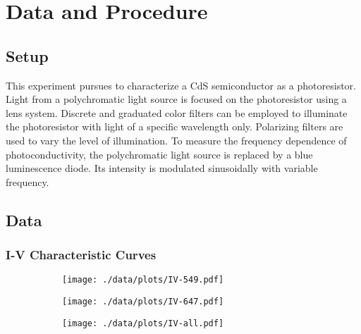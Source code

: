 \chapter{Data and Procedure}

\section{Setup}
This experiment pursues to characterize a CdS semiconductor as a photoresistor.
Light from a polychromatic light source is focused on the photoresistor using a lens system.
Discrete and graduated color filters can be employed to illuminate the photoresistor with light of a specific wavelength only.
Polarizing filters are used to vary the level of illumination.
To measure the frequency dependence of photoconductivity, the polychromatic light source is replaced by a blue luminescence diode.
Its intensity is modulated sinusoidally with variable frequency.

\section{Data}

\subsection{I-V Characteristic Curves}
\begin{figure}
	\centering
	\begin{subfigure}{0.45\textwidth}
		\centering
		\texttt{[image: ./data/plots/IV-549.pdf]}
		\label{fig:iv-549}
	\end{subfigure}
	\begin{subfigure}{0.45\textwidth}
		\centering
		\texttt{[image: ./data/plots/IV-647.pdf]}
		\label{fig:iv-647}
	\end{subfigure}
  \par\bigskip
	\begin{subfigure}{0.7\textwidth}
		\centering
		\texttt{[image: ./data/plots/IV-all.pdf]}
		\label{fig:iv-all}
	\end{subfigure}
  \label{fig:iv}
\end{figure}


